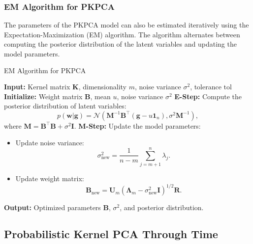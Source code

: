 \documentclass{article}
\begin{document}
    \subsubsection{EM Algorithm for PKPCA}
    
    The parameters of the PKPCA model can also be estimated iteratively using the Expectation-Maximization (EM) algorithm. The algorithm alternates between computing the posterior distribution of the latent variables and updating the model parameters.
    
    \begin{algorithm}[H]
    \caption{EM Algorithm for PKPCA}
    \begin{algorithmic}[1]
        \STATE \textbf{Input:} Kernel matrix \(\mathbf{K}\), dimensionality \(m\), noise variance \(\sigma^2\), tolerance \(\text{tol}\)
        \STATE \textbf{Initialize:} Weight matrix \(\mathbf{B}\), mean \(u\), noise variance \(\sigma^2\)
        \REPEAT
            \STATE \textbf{E-Step:} Compute the posterior distribution of latent variables:
            \[
            p(\mathbf{w} | \mathbf{g}) = \mathcal{N}(\mathbf{M}^{-1} \mathbf{B}^\top (\mathbf{g} - u \mathbf{1}_n), \sigma^2 \mathbf{M}^{-1}),
            \]
            where \(\mathbf{M} = \mathbf{B}^\top \mathbf{B} + \sigma^2 \mathbf{I}\).
            \STATE \textbf{M-Step:} Update the model parameters:
            \begin{itemize}
                \item Update noise variance:
                \[
                \sigma^2_{\text{new}} = \frac{1}{n - m} \sum_{j=m+1}^n \lambda_j.
                \]
                \item Update weight matrix:
                \[
                \mathbf{B}_{\text{new}} = \mathbf{U}_m (\mathbf{\Lambda}_m - \sigma^2_{\text{new}} \mathbf{I})^{1/2} \mathbf{R}.
                \]
            \end{itemize}
        \STATE \textbf{Output:} Optimized parameters \(\mathbf{B}\), \(\sigma^2\), and posterior distribution.
    \end{algorithmic}
    \end{algorithm}
    
\subsection{Probabilistic Kernel PCA Through Time}
\end{document}
